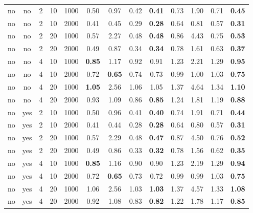 \begin{table}[ht]
\begin{tabular}{||cc|rrr||cccc|cccc||}
   \hline
\hline
no & no & 2 & 10 & 1000 & 0.50 & 0.97 & 0.42 & \bf 0.41 & 0.73 & 1.90 & 0.71 & \bf 0.45 \\ 
  no & no & 2 & 10 & 2000 & 0.41 & 0.45 & 0.29 & \bf 0.28 & 0.64 & 0.81 & 0.57 & \bf 0.31 \\ 
  no & no & 2 & 20 & 1000 & 0.57 & 2.27 & 0.48 & \bf 0.48 & 0.86 & 4.43 & 0.75 & \bf 0.53 \\ 
  no & no & 2 & 20 & 2000 & 0.49 & 0.87 & 0.34 & \bf 0.34 & 0.78 & 1.61 & 0.63 & \bf 0.37 \\ 
   \hline
no & no & 4 & 10 & 1000 & \bf 0.85 & 1.17 & 0.92 & 0.91 & 1.23 & 2.21 & 1.29 & \bf 0.95 \\ 
  no & no & 4 & 10 & 2000 & 0.72 & \bf 0.65 & 0.74 & 0.73 & 0.99 & 1.00 & 1.03 & \bf 0.75 \\ 
  no & no & 4 & 20 & 1000 & \bf 1.05 & 2.56 & 1.06 & 1.05 & 1.37 & 4.64 & 1.34 & \bf 1.10 \\ 
  no & no & 4 & 20 & 2000 & 0.93 & 1.09 & 0.86 & \bf 0.85 & 1.24 & 1.81 & 1.19 & \bf 0.88 \\ 
   \hline
no & yes & 2 & 10 & 1000 & 0.50 & 0.96 & 0.41 & \bf 0.40 & 0.74 & 1.91 & 0.71 & \bf 0.44 \\ 
  no & yes & 2 & 10 & 2000 & 0.41 & 0.44 & 0.28 & \bf 0.28 & 0.64 & 0.80 & 0.57 & \bf 0.31 \\ 
  no & yes & 2 & 20 & 1000 & 0.57 & 2.29 & 0.48 & \bf 0.47 & 0.87 & 4.50 & 0.76 & \bf 0.52 \\ 
  no & yes & 2 & 20 & 2000 & 0.49 & 0.86 & 0.33 & \bf 0.32 & 0.78 & 1.56 & 0.62 & \bf 0.35 \\ 
   \hline
no & yes & 4 & 10 & 1000 & \bf 0.85 & 1.16 & 0.90 & 0.90 & 1.23 & 2.19 & 1.29 & \bf 0.94 \\ 
  no & yes & 4 & 10 & 2000 & 0.72 & \bf 0.65 & 0.73 & 0.72 & 0.99 & 0.99 & 1.03 & \bf 0.75 \\ 
  no & yes & 4 & 20 & 1000 & 1.06 & 2.56 & 1.03 & \bf 1.03 & 1.37 & 4.57 & 1.33 & \bf 1.08 \\ 
  no & yes & 4 & 20 & 2000 & 0.92 & 1.08 & 0.83 & \bf 0.82 & 1.22 & 1.78 & 1.17 & \bf 0.85 \\ 
   \hline
\hline
\end{tabular}
\end{table}
